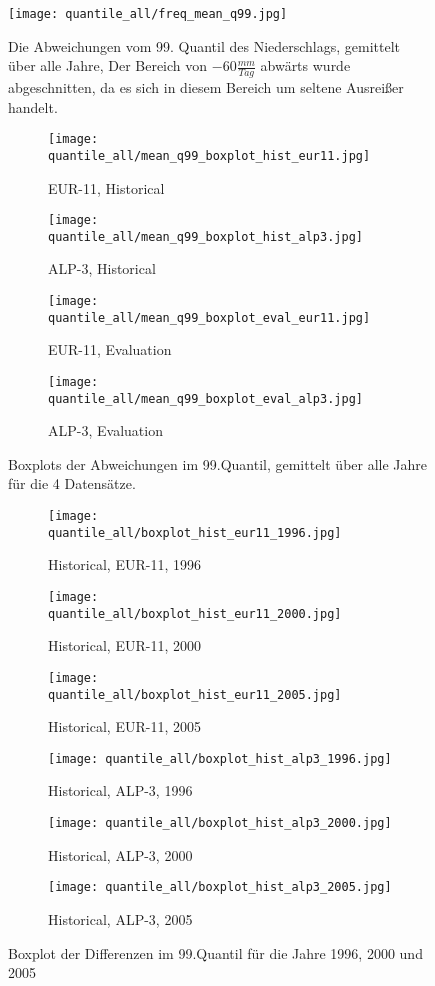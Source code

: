 \begin{figure}
	\texttt{[image: quantile\_all/freq\_mean\_q99.jpg]}
	\caption{Die Abweichungen vom 99. Quantil des Niederschlags, gemittelt über alle Jahre, Der Bereich von $-60\frac{mm}{Tag}$ abwärts wurde abgeschnitten, da es sich in diesem Bereich um seltene Ausreißer handelt.}
	\label{fig:quantile_all}
\end{figure}
\begin{figure}
	\begin{subfigure}{0.49\textwidth}
		\texttt{[image: quantile\_all/mean\_q99\_boxplot\_hist\_eur11.jpg]}
		\caption{EUR-11, Historical}
	\end{subfigure}
	\begin{subfigure}{0.49\textwidth}
		\texttt{[image: quantile\_all/mean\_q99\_boxplot\_hist\_alp3.jpg]}
		\caption{ALP-3, Historical}
	\end{subfigure}
	\begin{subfigure}{0.49\textwidth}
		\texttt{[image: quantile\_all/mean\_q99\_boxplot\_eval\_eur11.jpg]}
		\caption{EUR-11, Evaluation}
	\end{subfigure}
	\begin{subfigure}{0.49\textwidth}
		\texttt{[image: quantile\_all/mean\_q99\_boxplot\_eval\_alp3.jpg]}
		\caption{ALP-3, Evaluation}
	\end{subfigure}
	\caption{Boxplots der Abweichungen im 99.Quantil, gemittelt über alle Jahre für die 4 Datensätze.}
	\label{fig:quantile_all_boxplots}
\end{figure}
\begin{figure}
	\begin{subfigure}{0.32\textwidth}
		\texttt{[image: quantile\_all/boxplot\_hist\_eur11\_1996.jpg]}
		\caption{Historical, EUR-11, 1996}
	\end{subfigure}
	\begin{subfigure}{0.32\textwidth}
		\texttt{[image: quantile\_all/boxplot\_hist\_eur11\_2000.jpg]}
		\caption{Historical, EUR-11, 2000}
	\end{subfigure}
	\begin{subfigure}{0.32\textwidth}
		\texttt{[image: quantile\_all/boxplot\_hist\_eur11\_2005.jpg]}
		\caption{Historical, EUR-11, 2005}
	\end{subfigure}
	\begin{subfigure}{0.32\textwidth}
		\texttt{[image: quantile\_all/boxplot\_hist\_alp3\_1996.jpg]}
		\caption{Historical, ALP-3, 1996}
	\end{subfigure}
	\begin{subfigure}{0.32\textwidth}
		\texttt{[image: quantile\_all/boxplot\_hist\_alp3\_2000.jpg]}
		\caption{Historical, ALP-3, 2000}
	\end{subfigure}
	\begin{subfigure}{0.32\textwidth}
		\texttt{[image: quantile\_all/boxplot\_hist\_alp3\_2005.jpg]}
		\caption{Historical, ALP-3, 2005}
	\end{subfigure}
	\caption{Boxplot der Differenzen im 99.Quantil für die Jahre 1996, 2000 und 2005}
\label{fig:quantile_all_boxplot_all_years_1}
\end{figure}
